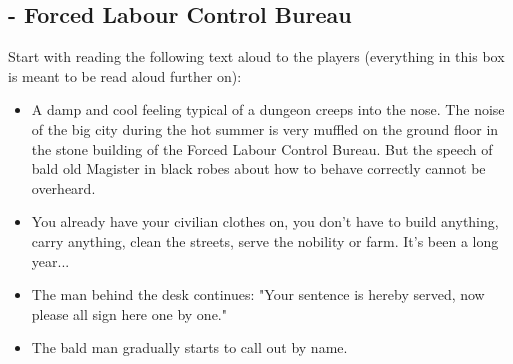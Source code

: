 \documentclass[10pt,onecolumn,twoside,openany,bg=full,layout=true]{dndbook}
\begin{document}
\setcounter{subact_num}{1}
\subsection{ - Forced Labour Control Bureau}\label{subsec:\arabic{subact_num}-forced-labour-control-bureau}
\addtocounter{subact_num}{1}

Start with reading the following text aloud to the players (everything in this box is meant to be read aloud further on):
\begin{DndReadAloud}
\begin{itemize}
\item A damp and cool feeling typical of a dungeon creeps into the nose.
The noise of the big city during the hot summer is very muffled on the ground floor in the stone building of the Forced Labour Control Bureau.
But the speech of bald old Magister in black robes about how to behave correctly cannot be overheard.
\item You already have your civilian clothes on, you don't have to build anything, carry anything, clean the streets,
serve the nobility or farm.
It's been a long year...
\item The man behind the desk continues:
"Your sentence is hereby served, now please all sign here one by one."
\item The bald man gradually starts to call out by name.
\end{itemize}
\end{DndReadAloud}
\end{document}
